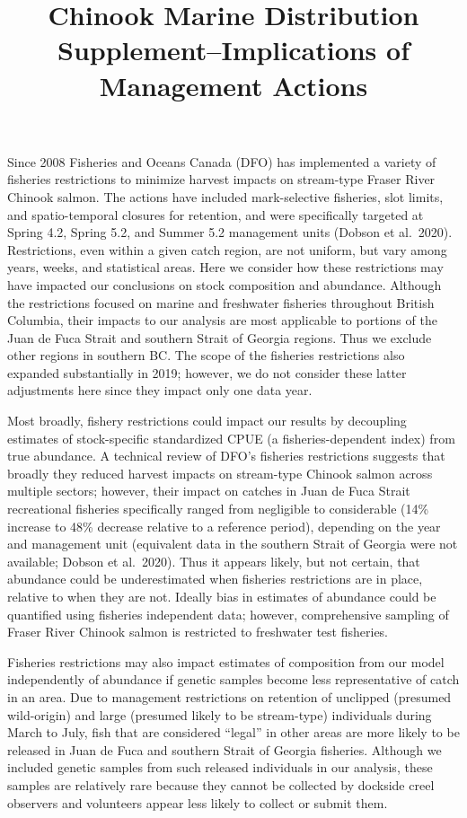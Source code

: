 \documentclass[
]{article}
\title{Chinook Marine Distribution Supplement--Implications of Management
Actions}
\author{}
\date{\vspace{-2.5em}}
\begin{document}
\maketitle

Since 2008 Fisheries and Oceans Canada (DFO) has implemented a variety
of fisheries restrictions to minimize harvest impacts on stream-type
Fraser River Chinook salmon. The actions have included mark-selective
fisheries, slot limits, and spatio-temporal closures for retention, and
were specifically targeted at Spring 4.2, Spring 5.2, and Summer 5.2
management units (Dobson et al.~2020). Restrictions, even within a given
catch region, are not uniform, but vary among years, weeks, and
statistical areas. Here we consider how these restrictions may have
impacted our conclusions on stock composition and abundance. Although
the restrictions focused on marine and freshwater fisheries throughout
British Columbia, their impacts to our analysis are most applicable to
portions of the Juan de Fuca Strait and southern Strait of Georgia
regions. Thus we exclude other regions in southern BC. The scope of the
fisheries restrictions also expanded substantially in 2019; however, we
do not consider these latter adjustments here since they impact only one
data year.

Most broadly, fishery restrictions could impact our results by
decoupling estimates of stock-specific standardized CPUE (a
fisheries-dependent index) from true abundance. A technical review of
DFO's fisheries restrictions suggests that broadly they reduced harvest
impacts on stream-type Chinook salmon across multiple sectors; however,
their impact on catches in Juan de Fuca Strait recreational fisheries
specifically ranged from negligible to considerable (14\% increase to
48\% decrease relative to a reference period), depending on the year and
management unit (equivalent data in the southern Strait of Georgia were
not available; Dobson et al.~2020). Thus it appears likely, but not
certain, that abundance could be underestimated when fisheries
restrictions are in place, relative to when they are not. Ideally bias
in estimates of abundance could be quantified using fisheries
independent data; however, comprehensive sampling of Fraser River
Chinook salmon is restricted to freshwater test fisheries.

Fisheries restrictions may also impact estimates of composition from our
model independently of abundance if genetic samples become less
representative of catch in an area. Due to management restrictions on
retention of unclipped (presumed wild-origin) and large (presumed likely
to be stream-type) individuals during March to July, fish that are
considered ``legal'' in other areas are more likely to be released in
Juan de Fuca and southern Strait of Georgia fisheries. Although we
included genetic samples from such released individuals in our analysis,
these samples are relatively rare because they cannot be collected by
dockside creel observers and volunteers appear less likely to collect or
submit them.
\end{document}
